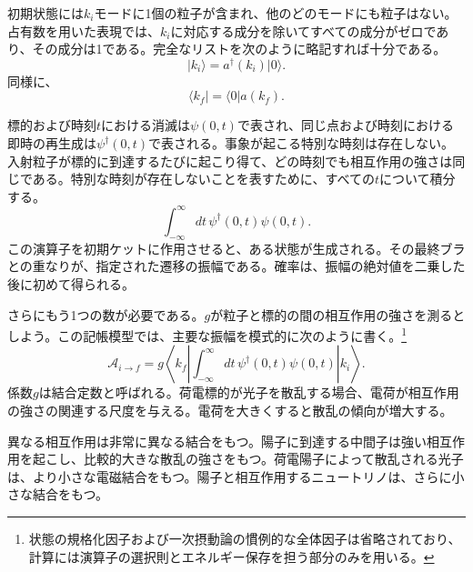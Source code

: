 初期状態には\(k_i\)モードに1個の粒子が含まれ、他のどのモードにも粒子はない。占有数を用いた表現では、\(k_i\)に対応する成分を除いてすべての成分がゼロであり、その成分は1である。完全なリストを次のように略記すれば十分である。
\begin{equation}
\lvert k_i\rangle=a^\dagger(k_i)\lvert0\rangle.
\end{equation}
同様に、
\begin{equation}
\langle k_f\rvert=\langle0\rvert a(k_f).
\end{equation}

標的および時刻\(t\)における消滅は\(\psi(0,t)\)で表され、同じ点および時刻における即時の再生成は\(\psi^\dagger(0,t)\)で表される。事象が起こる特別な時刻は存在しない。入射粒子が標的に到達するたびに起こり得て、どの時刻でも相互作用の強さは同じである。特別な時刻が存在しないことを表すために、すべての\(t\)について積分する。
\begin{equation}
\int_{-\infty}^{\infty}dt\,\psi^\dagger(0,t)\psi(0,t).
\end{equation}
この演算子を初期ケットに作用させると、ある状態が生成される。その最終ブラとの重なりが、指定された遷移の振幅である。確率は、振幅の絶対値を二乗した後に初めて得られる。

さらにもう1つの数が必要である。\(g\)が粒子と標的の間の相互作用の強さを測るとしよう。この記帳模型では、主要な振幅を模式的に次のように書く。\footnote{状態の規格化因子および一次摂動論の慣例的な全体因子は省略されており、計算には演算子の選択則とエネルギー保存を担う部分のみを用いる。}
\begin{equation}
\mathcal A_{i\to f}
=g\left\langle k_f\left|
\int_{-\infty}^{\infty}dt\,
\psi^\dagger(0,t)\psi(0,t)
\right|k_i\right\rangle.
\end{equation}
係数\(g\)は結合定数と呼ばれる。荷電標的が光子を散乱する場合、電荷が相互作用の強さの関連する尺度を与える。電荷を大きくすると散乱の傾向が増大する。

異なる相互作用は非常に異なる結合をもつ。陽子に到達する中間子は強い相互作用を起こし、比較的大きな散乱の強さをもつ。荷電陽子によって散乱される光子は、より小さな電磁結合をもつ。陽子と相互作用するニュートリノは、さらに小さな結合をもつ。

\begin{classroomqa}
\end{classroomqa}

